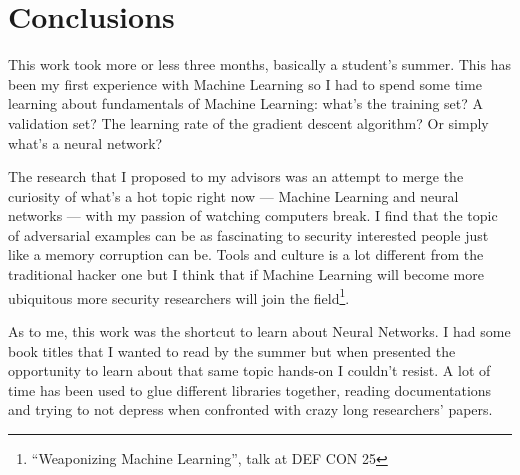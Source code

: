 \chapter*{Conclusions}

This work took more or less three months, basically a student's summer.
This has been my first experience with Machine Learning so I had to
spend some time learning about fundamentals of Machine Learning: what's
the training set? A validation set? The learning rate of the gradient
descent algorithm? Or simply what's a neural network?

The research that I proposed to my advisors was an attempt to merge the
curiosity of what's a hot topic right now --- Machine Learning and
neural networks --- with my passion of watching computers break. I find
that the topic of adversarial examples can be as fascinating to
security interested people just like a memory corruption can be. Tools
and culture is a lot different from the traditional hacker one but I
think that if Machine Learning will become more ubiquitous more
security researchers will join the field\footnote{``Weaponizing Machine
  Learning'', talk at DEF CON 25}.

As to me, this work was the shortcut to learn about Neural Networks. I
had some book titles that I wanted to read by the summer but when
presented the opportunity to learn about that same topic hands-on I
couldn't resist. A lot of time has been used to glue different
libraries together, reading documentations and trying to not depress
when confronted with crazy long researchers' papers.
